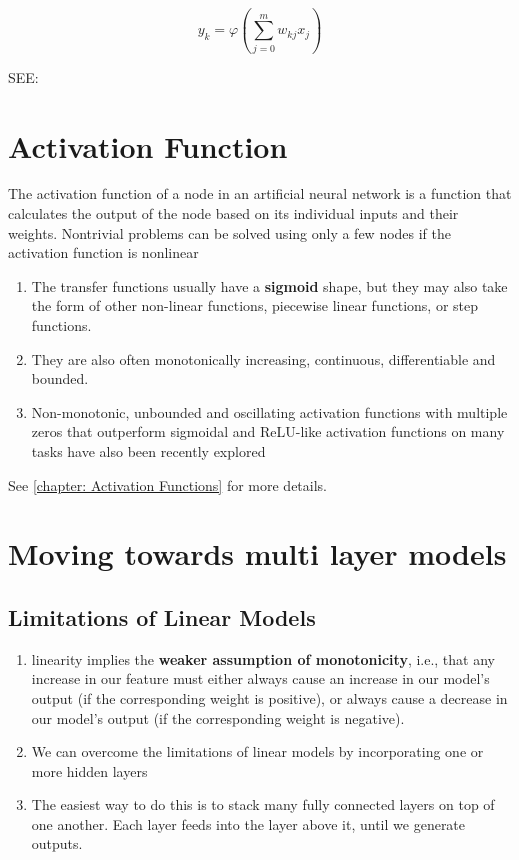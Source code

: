 \[
     y_{k}=\varphi \left(\sum _{j=0}^{m}w_{kj}x_{j}\right)
\]


SEE: 



\section{Activation Function \cite{wiki-Artificial_neuron, wiki-activation-fn}}
The activation function of a node in an artificial neural network is a function that calculates the output of the node based on its individual inputs and their weights. Nontrivial problems can be solved using only a few nodes if the activation function is nonlinear


\begin{enumerate}
    \item  The transfer functions usually have a \textbf{sigmoid} shape, but they may also take the form of other non-linear functions, piecewise linear functions, or step functions.
    \item They are also often monotonically increasing, continuous, differentiable and bounded. 
    \item  Non-monotonic, unbounded and oscillating activation functions with multiple zeros that outperform sigmoidal and ReLU-like activation functions on many tasks have also been recently explored
\end{enumerate}

See \ref{chapter: Activation Functions} for more details.





\section{Moving towards multi layer models}
\subsection{Limitations of Linear Models \cite{dnn-1}}

\begin{enumerate}
    \item linearity implies the \textbf{weaker assumption of monotonicity}, i.e., that any increase in our feature must either always cause an increase in our model’s output (if the corresponding weight is positive), or always cause a decrease in our model’s output (if the corresponding weight is negative).

    \item We can overcome the limitations of linear models by incorporating one or more hidden layers

    \item The easiest way to do this is to stack many fully connected layers on top of one another. Each layer feeds into the layer above it, until we generate outputs. 
\end{enumerate}

